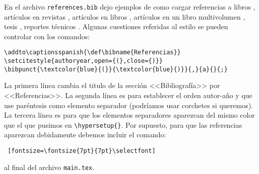 \documentclass[a4paper,10pt,twocolumn,twoside]{article}
\begin{document}
En el archivo \texttt{references.bib} dejo ejemplos de como cargar referencias a libros \citep{ANDREWS1987,HOLTON2004}, artículos en revistas \citep{BALDWINetal2020-11}, artículos en libros \citep{PLUMB2010}, artículos en un libro multivolumen \citep{ONEILLetal2015}, tesis \citep{CLARK2017-11}, reportes técnicos \citep{LIMetal2020-1}. Algunas cuestiones referidas al estilo se pueden controlar con los comandos:
\begin{Verbatim}[fontsize=\fontsize{7pt}{7pt}\selectfont]
\addto\captionsspanish{\def\bibname{Referencias}}
\setcitestyle{authoryear,open={(},close={)}}
\bibpunct{\textcolor{blue}{(}}{\textcolor{blue}{)}}{,}{a}{}{;}
\end{Verbatim}
La primera línea cambia el titulo de la sección <<Bibliografía>> por <<Referencias>>. La segunda línea es para establecer el orden autor-año y que use paréntesis como elemento separador (podríamos usar corchetes si queremos). La tercera línea es para que los elementos separadores aparezcan del mismo color que el que pusimos en \verb+\hypersetup{}+. Por supuesto, para que las referencias aparezcan debidamente debemos incluir el comando:
\begin{Verbatim} [fontsize=\fontsize{7pt}{7pt}\selectfont]

\end{Verbatim}
al final del archivo \texttt{main.tex}.

\appendix
\vspace{1ex}
\begin{center}
\end{center} 
\end{document}
